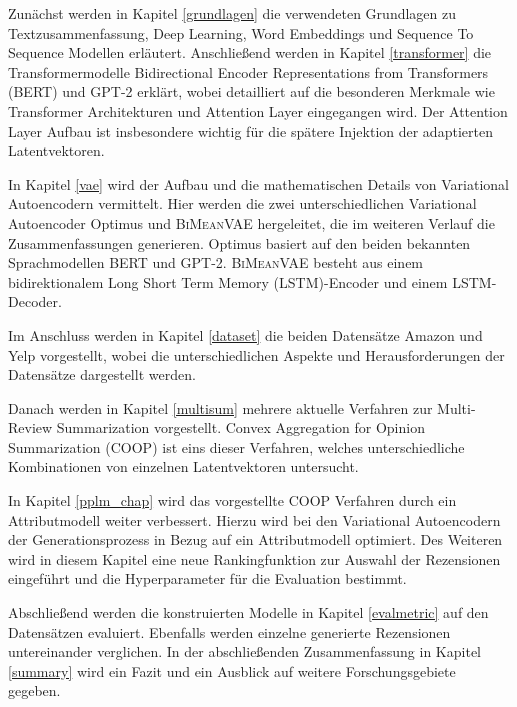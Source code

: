 Zunächst werden in Kapitel \ref{grundlagen} die verwendeten Grundlagen zu Textzusammenfassung, Deep Learning, Word Embeddings und Sequence To Sequence Modellen erläutert.
Anschließend werden in Kapitel \ref{transformer} die Transformermodelle Bidirectional Encoder Representations from Transformers (BERT) und GPT-2 erklärt, wobei detailliert auf die besonderen Merkmale wie Transformer Architekturen und Attention Layer eingegangen wird.
Der Attention Layer Aufbau ist insbesondere wichtig für die spätere Injektion der adaptierten Latentvektoren.

In Kapitel \ref{vae} wird der Aufbau und die mathematischen Details von Variational Autoencodern vermittelt.
Hier werden die zwei unterschiedlichen Variational Autoencoder Optimus und \textsc{BiMeanVAE} hergeleitet, die im weiteren Verlauf die Zusammenfassungen generieren.
Optimus basiert auf den beiden bekannten Sprachmodellen BERT und GPT-2. 
\textsc{BiMeanVAE} besteht aus einem bidirektionalem Long Short Term Memory (LSTM)-Encoder und einem LSTM-Decoder.

Im Anschluss werden in Kapitel \ref{dataset} die beiden Datensätze Amazon und Yelp vorgestellt, wobei die unterschiedlichen Aspekte und Herausforderungen der Datensätze dargestellt werden.

Danach werden in Kapitel \ref{multisum} mehrere aktuelle Verfahren zur Multi-Review Summarization vorgestellt. 
Convex Aggregation for Opinion Summarization (COOP) ist eins dieser Verfahren, welches unterschiedliche Kombinationen von einzelnen Latentvektoren untersucht.

In Kapitel \ref{pplm_chap} wird das vorgestellte COOP Verfahren durch ein Attributmodell weiter verbessert. 
Hierzu wird bei den Variational Autoencodern der Generationsprozess in Bezug auf ein Attributmodell optimiert.
Des Weiteren wird in diesem Kapitel eine neue Rankingfunktion zur Auswahl der Rezensionen eingeführt und die Hyperparameter für die Evaluation bestimmt.

Abschließend werden die konstruierten Modelle in Kapitel \ref{evalmetric} auf den Datensätzen evaluiert. Ebenfalls werden einzelne generierte Rezensionen untereinander verglichen.
In der abschließenden Zusammenfassung in Kapitel \ref{summary} wird ein Fazit und ein Ausblick auf weitere Forschungsgebiete gegeben.  





